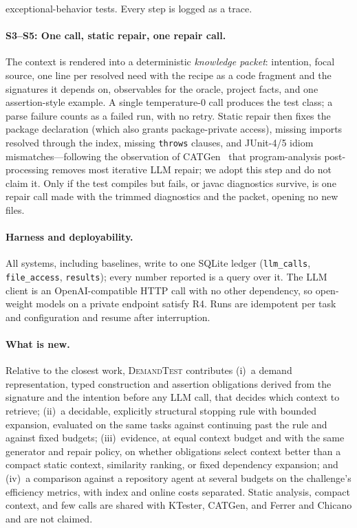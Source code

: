 \documentclass[sigconf,nonacm]{acmart}
\newcommand{\tool}{\textsc{DemandTest}\xspace}
\begin{document}
exceptional-behavior tests. Every step is logged as a trace.

\paragraph{S3--S5: One call, static repair, one repair call.}
The context is rendered into a deterministic \emph{knowledge packet}: intention, focal source, one line per resolved need with the recipe as a code fragment and the signatures it depends on, observables for the oracle, project facts, and one assertion-style example. A single temperature-0 call produces the test class; a parse failure counts as a failed run, with no retry. Static repair then fixes the package declaration (which also grants package-private access), missing imports resolved through the index, missing \texttt{throws} clauses, and JUnit-4/5 idiom mismatches---following the observation of CATGen~\cite{chen2026catgen} that program-analysis post-processing removes most iterative LLM repair; we adopt this step and do not claim it. Only if the test compiles but fails, or javac diagnostics survive, is one repair call made with the trimmed diagnostics and the packet, opening no new files.

\paragraph{Harness and deployability.}
All systems, including baselines, write to one SQLite ledger (\texttt{llm\_calls}, \texttt{file\_access}, \texttt{results}); every number reported is a query over it. The LLM client is an OpenAI-compatible HTTP call with no other dependency, so open-weight models on a private endpoint satisfy R4. Runs are idempotent per task and configuration and resume after interruption.

\paragraph{What is new.}
Relative to the closest work, \tool contributes (i)~a demand representation, typed construction and assertion obligations derived from the signature and the intention before any LLM call, that decides which context to retrieve; (ii)~a decidable, explicitly structural stopping rule with bounded expansion, evaluated on the same tasks against continuing past the rule and against fixed budgets; (iii)~evidence, at equal context budget and with the same generator and repair policy, on whether obligations select context better than a compact static context, similarity ranking, or fixed dependency expansion; and (iv)~a comparison against a repository agent at several budgets on the challenge's efficiency metrics, with index and online costs separated. Static analysis, compact context, and few calls are shared with KTester, CATGen, and Ferrer and Chicano and are not claimed.
\end{document}
